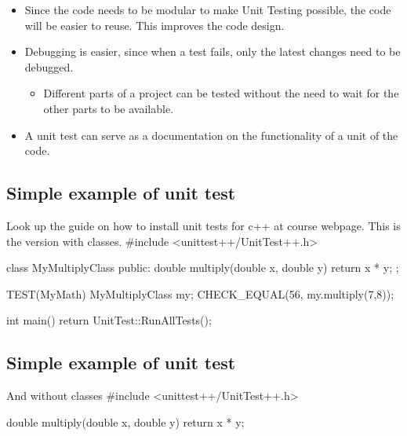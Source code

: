 \documentclass[%
twoside,                 %
final,                   %
10pt]{article}
\newenvironment{block_mdfboxadmon}[1][]{
\begin{block_mdfboxmdframed}[frametitle=#1]
}
{
\end{block_mdfboxmdframed}
}
\begin{document}
{{{{{{{{{{\begin{block_mdfboxadmon}[]
\begin{itemize}
  \item Since the code needs to be modular to make Unit Testing possible, the code will be easier to reuse. This improves the code design.

  \item Debugging is easier, since when a test fails, only the latest changes need to be debugged.
\begin{itemize}

   \item Different parts of a project can be tested without the need to wait for the other parts to be available.

\end{itemize}

\noindent
  \item A unit test can serve as a documentation on the functionality of a unit of the code.
\end{itemize}

\noindent
\end{block_mdfboxadmon}




\subsection{Simple example of unit test}

\begin{block_mdfboxadmon}[]
Look up the guide on how to install unit tests for c++ at course webpage. This is the version with classes.
\bcppcod
#include <unittest++/UnitTest++.h>

class MyMultiplyClass{
public:
    double multiply(double x, double y) {
        return x * y;
    }
};

TEST(MyMath) {
    MyMultiplyClass my;
    CHECK_EQUAL(56, my.multiply(7,8));
}

int main()
{
    return UnitTest::RunAllTests();
}
\ecppcod
\end{block_mdfboxadmon}



\subsection{Simple example of unit test}

\begin{block_mdfboxadmon}[]
And without classes
\bcppcod
#include <unittest++/UnitTest++.h>


double multiply(double x, double y) {
    return x * y;
}


\end{block_mdfboxadmon}}}}}}}}}}}
\end{document}
